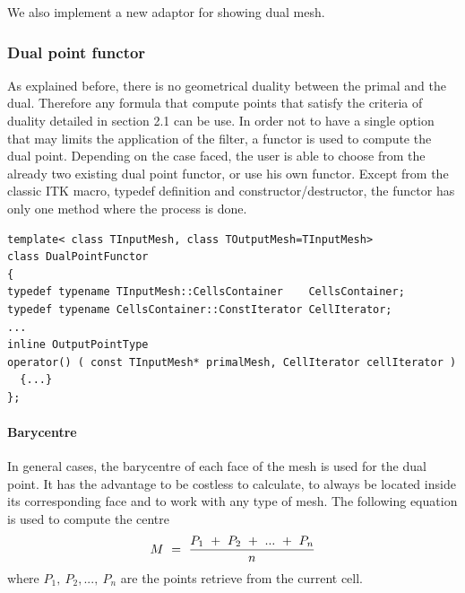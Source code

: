 \documentclass{InsightArticle}
\begin{document}
We also implement a new adaptor for showing dual mesh.
\subsubsection{Dual point functor}
As explained before, there is no geometrical duality between the primal and the dual. Therefore any formula that compute points that satisfy the criteria of duality detailed in section 2.1 can be use. In order not to have a single option that may limits the application of the filter, a functor is used to compute the dual point. Depending on the case faced, the user is able to choose from the already two existing dual point functor, or use his own functor. Except from the classic ITK macro, typedef definition and constructor/destructor, the functor has only one method where the process is done.
\begin{verbatim}
template< class TInputMesh, class TOutputMesh=TInputMesh>
class DualPointFunctor
{
typedef typename TInputMesh::CellsContainer    CellsContainer;
typedef typename CellsContainer::ConstIterator CellIterator;
...
inline OutputPointType 
operator() ( const TInputMesh* primalMesh, CellIterator cellIterator ) 
  {...}
};
\end{verbatim}
\paragraph{\textbf{Barycentre}}
In general cases, the barycentre of each face of the mesh is used for the dual point. It has the advantage to be costless to calculate, to always be located inside its corresponding face and to work with any type of mesh. The following equation is used to compute the centre
\begin{equation}
\label{eq5}
M~=~\frac{P_1~+~P_2~+~\mathnormal{...}~+~P_n}{n}
\end{equation}
where $P_1,~P_2, ...,~P_n$ are the points retrieve from the current cell.
\end{document}
